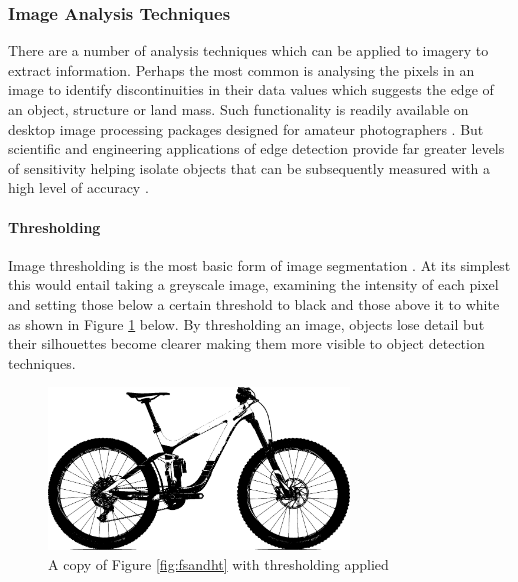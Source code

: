 \subsubsection{Image Analysis Techniques}
	There are a number of analysis techniques which can be applied to imagery to extract information. Perhaps the most common is analysing the pixels in an image to identify discontinuities in their data values which suggests the edge of an object, structure or land mass. Such functionality is readily available on desktop image processing packages designed for amateur photographers \citep{photoshop}. But scientific and engineering applications of edge detection provide far greater levels of sensitivity helping isolate objects that can be subsequently measured with a high level of accuracy \citep{matlabedge}.
	\paragraph{Thresholding}
		Image thresholding is the most basic form of image segmentation \citep{haralock1991computer}. At its simplest this would entail taking a greyscale image, examining the intensity of each pixel and setting those below a certain threshold to black and those above it to white as shown in Figure \ref{fig:threshold} below. By thresholding an image, objects lose detail but their silhouettes become clearer making them more visible to object detection techniques.
		\begin{figure}[h!]
			\centering
			\includegraphics[width=8cm]{../images/reign_threshold.jpg}
			\caption{A copy of Figure \ref{fig:fsandht} with thresholding applied}
			\label{fig:threshold}
		\end{figure}
